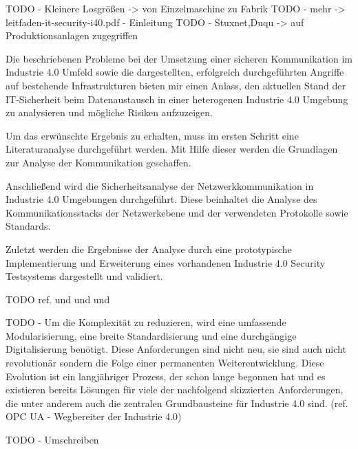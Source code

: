 TODO - Kleinere Losgrößen -> von Einzelmaschine zu Fabrik
TODO - mehr -> leitfaden-it-security-i40.pdf - Einleitung
TODO - Stuxnet,Duqu -> auf Produktionsanlagen zugegriffen

Die beschriebenen Probleme bei der Umsetzung einer sicheren Kommunikation im Industrie 4.0 Umfeld sowie die dargestellten, erfolgreich durchgeführten Angriffe auf bestehende Infrastrukturen bieten mir einen Anlass, den aktuellen Stand der IT-Sicherheit beim Datenaustausch in einer heterogenen Industrie 4.0 Umgebung zu analysieren und mögliche Risiken aufzuzeigen.

Um das erwünschte Ergebnis zu erhalten, muss im ersten Schritt eine Literaturanalyse durchgeführt werden. Mit Hilfe dieser werden die Grundlagen zur Analyse der Kommunikation geschaffen. 

Anschließend wird die Sicherheitsanalyse der Netzwerkkommunikation in Industrie 4.0 Umgebungen durchgeführt. Diese beinhaltet die Analyse des Kommunikationsstacks der Netzwerkebene und der verwendeten Protokolle sowie Standards.

Zuletzt werden die Ergebnisse der Analyse durch eine prototypische Implementierung und Erweiterung eines vorhandenen Industrie 4.0 Security Testsystems dargestellt und validiert. 

TODO ref. \cite{Halang2016} und \cite{BMWiSuK2016} und \cite{Schleupner2016} und \cite{Sander2014}

TODO - Um die Komplexität zu reduzieren, wird eine umfassende Modularisierung, eine breite Standardisierung und eine durchgängige Digitalisierung benötigt. Diese Anforderungen sind nicht neu, sie sind auch nicht revolutionär sondern die Folge einer permanenten Weiterentwicklung. Diese Evolution ist ein langjähriger Prozess, der schon lange begonnen hat und es existieren bereits Lösungen für viele der nachfolgend skizzierten Anforderungen, die unter anderem auch die zentralen Grundbausteine für Industrie 4.0 sind. (ref. OPC UA - Wegbereiter der Industrie 4.0)

TODO - Umschreiben
